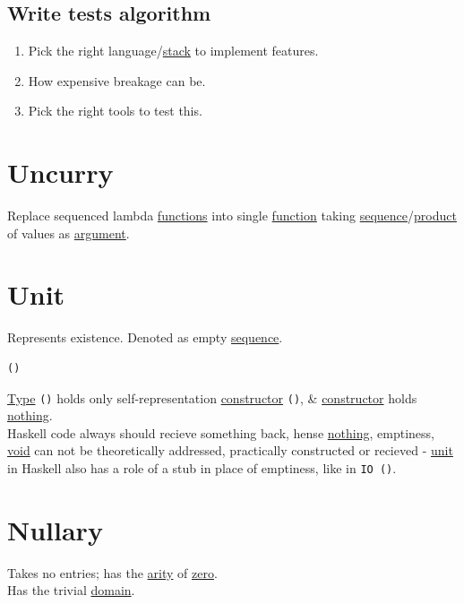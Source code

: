 \documentclass[a4paper,14pt,oneside]{book}
\begin{document}
\section{Write tests algorithm}
\label{sec:org2995b6b}

\begin{enumerate}
\item Pick the right language/\hyperref[org2b65b14]{stack} to implement features.\\
\item How expensive breakage can be.\\
\item Pick the right tools to test this.\\
\end{enumerate}

\chapter{\label{org1ee35d3}Uncurry}
\label{sec:org5ce6d0f}
Replace sequenced lambda \hyperref[org788d18f]{functions} into single \hyperref[org9530a6b]{function} taking \hyperref[org8265f32]{sequence}/\hyperref[org814b557]{product} of values as \hyperref[org86f3f7b]{argument}.\\

\chapter{\label{orgf09cc4a}Unit}
\label{sec:org00b6271}
Represents existence. Denoted as empty \hyperref[org8265f32]{sequence}.\\
\begin{verbatim}
()
\end{verbatim}

\hyperref[org35b9249]{Type} \texttt{()} holds only self-representation \hyperref[orge41bf62]{constructor} \texttt{()}, \& \hyperref[orge41bf62]{constructor} holds \hyperref[orga006e70]{nothing}.\\

Haskell code always should recieve something back, hense \hyperref[orga006e70]{nothing}, emptiness, \hyperref[org305758f]{void} can not be theoretically addressed, practically constructed or recieved - \hyperref[orgf09cc4a]{unit} in Haskell also has a role of a stub in place of emptiness, like in \texttt{IO ()}.\\

\chapter{\label{orgc017d33}Nullary}
\label{sec:org892fb18}
Takes no entries; has the \hyperref[org4746afc]{arity} of \hyperref[org298ecfc]{zero}.\\
Has the trivial \hyperref[org0cadcd1]{domain}.\\
\end{document}
